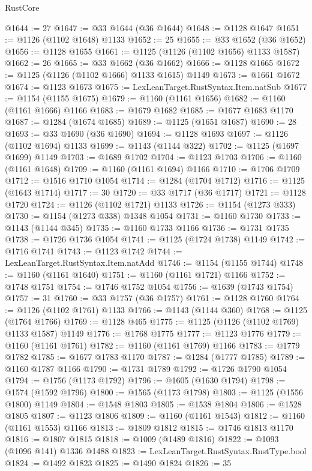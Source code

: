 \begin{lexlean}{RustCore}
\begin{coremodule}
@1644 := 27
@1647 := @33 @1644 (@36 @1644)
@1648 := @1128 @1647
@1651 := @1126 (@1102 @1648) @1133
@1652 := 25
@1655 := @33 @1652 (@36 @1652)
@1656 := @1128 @1655
@1661 := @1125 (@1126 (@1102 @1656) @1133 @1587)
@1662 := 26
@1665 := @33 @1662 (@36 @1662)
@1666 := @1128 @1665
@1672 := @1125 (@1126 (@1102 @1666) @1133 @1615) @1149
@1673 := @1661 @1672
@1674 := @1123 @1673
@1675 := LexLeanTarget.RustSyntax.Item.natSub
@1677 := @1154 (@1155 @1675)
@1679 := @1160 (@1161 @1656)
@1682 := @1160 (@1161 @1666) @1166
@1683 := @1679 @1682
@1685 := @1677 @1683 @1170
@1687 := @1284 (@1674 @1685)
@1689 := @1125 (@1651 @1687)
@1690 := 28
@1693 := @33 @1690 (@36 @1690)
@1694 := @1128 @1693
@1697 := @1126 (@1102 @1694) @1133
@1699 := @1143 (@1144 @322)
@1702 := @1125 (@1697 @1699) @1149
@1703 := @1689 @1702
@1704 := @1123 @1703
@1706 := @1160 (@1161 @1648)
@1709 := @1160 (@1161 @1694) @1166
@1710 := @1706 @1709
@1712 := @1516 @1710 @1054
@1714 := @1284 (@1704 @1712)
@1716 := @1125 (@1643 @1714)
@1717 := 30
@1720 := @33 @1717 (@36 @1717)
@1721 := @1128 @1720
@1724 := @1126 (@1102 @1721) @1133
@1726 := @1154 (@1273 @333)
@1730 := @1154 (@1273 @338) @1348 @1054
@1731 := @1160 @1730
@1733 := @1143 (@1144 @345)
@1735 := @1160 @1733 @1166
@1736 := @1731 @1735
@1738 := @1726 @1736 @1054
@1741 := @1125 (@1724 @1738) @1149
@1742 := @1716 @1741
@1743 := @1123 @1742
@1744 := LexLeanTarget.RustSyntax.Item.natAdd
@1746 := @1154 (@1155 @1744)
@1748 := @1160 (@1161 @1640)
@1751 := @1160 (@1161 @1721) @1166
@1752 := @1748 @1751
@1754 := @1746 @1752 @1054
@1756 := @1639 (@1743 @1754)
@1757 := 31
@1760 := @33 @1757 (@36 @1757)
@1761 := @1128 @1760
@1764 := @1126 (@1102 @1761) @1133
@1766 := @1143 (@1144 @360)
@1768 := @1125 (@1764 @1766)
@1769 := @1128 @465
@1775 := @1125 (@1126 (@1102 @1769) @1133 @1587) @1149
@1776 := @1768 @1775
@1777 := @1123 @1776
@1779 := @1160 (@1161 @1761)
@1782 := @1160 (@1161 @1769) @1166
@1783 := @1779 @1782
@1785 := @1677 @1783 @1170
@1787 := @1284 (@1777 @1785)
@1789 := @1160 @1787 @1166
@1790 := @1731 @1789
@1792 := @1726 @1790 @1054
@1794 := @1756 (@1173 @1792)
@1796 := @1605 (@1630 @1794)
@1798 := @1574 (@1592 @1796)
@1800 := @1565 (@1173 @1798)
@1803 := @1125 (@1556 @1800) @1149
@1804 := @1548 @1803
@1805 := @1538 @1804
@1806 := @1528 @1805
@1807 := @1123 @1806
@1809 := @1160 (@1161 @1543)
@1812 := @1160 (@1161 @1553) @1166
@1813 := @1809 @1812
@1815 := @1746 @1813 @1170
@1816 := @1807 @1815
@1818 := @1009 (@1489 @1816)
@1822 := @1093 (@1096 @141) @1336 @1488
@1823 := LexLeanTarget.RustSyntax.RustType.bool
@1824 := @1492 @1823
@1825 := @1490 @1824
@1826 := 35

\end{coremodule}
\end{lexlean}
